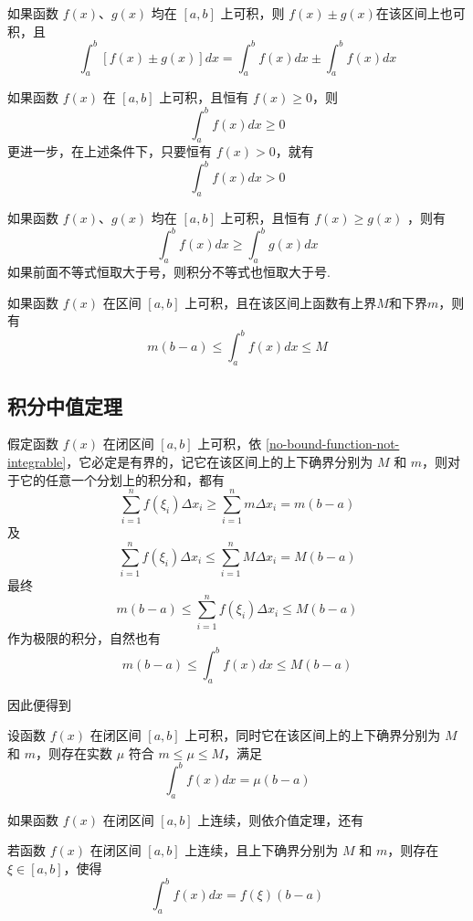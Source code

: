 \begin{property}
  如果函数 $f(x)$、$g(x)$ 均在 $[a,b]$ 上可积，则 $f(x)\pm g(x)$在该区间上也可积，且
  \[ \int_a^b [f(x) \pm g(x)] dx =  \int_a^b f(x) dx \pm \int_a^b f(x) dx \]
\end{property}

\begin{property}
  如果函数 $f(x)$ 在 $[a,b]$ 上可积，且恒有 $f(x) \geqslant 0$，则
  \[ \int_a^b f(x) dx \geqslant 0 \]
  更进一步，在上述条件下，只要恒有 $f(x) > 0$，就有
  \[ \int_a^b f(x) dx > 0 \]
\end{property}

\begin{property}
  如果函数 $f(x)$、$g(x)$ 均在 $[a,b]$ 上可积，且恒有 $f(x) \geqslant g(x)$ ，则有
  \[ \int_a^b f(x) dx \geqslant \int_a^{b} g(x) dx \] 
  如果前面不等式恒取大于号，则积分不等式也恒取大于号.
\end{property}

\begin{property}
  如果函数 $f(x)$ 在区间 $[a,b]$ 上可积，且在该区间上函数有上界$M$和下界$m$，则有
  \[ m(b-a) \leqslant \int_a^{b} f(x) dx \leqslant M \]
\end{property}

\subsection{积分中值定理}
\label{sec:integral-midvalue-theoream}

假定函数 $f(x)$ 在闭区间 $[a,b]$ 上可积，依 \autoref{no-bound-function-not-integrable}，它必定是有界的，记它在该区间上的上下确界分别为 $M$ 和 $m$，则对于它的任意一个分划上的积分和，都有
\[ \sum_{i=1}^nf(\xi_i)\Delta x_i \geqslant \sum_{i=1}^n m\Delta x_i = m(b-a) \]
及
\[ \sum_{i=1}^nf(\xi_i)\Delta x_i \leqslant \sum_{i=1}^n M\Delta x_i = M(b-a) \]
最终
\[ m(b-a) \leqslant \sum_{i=1}^nf(\xi_i)\Delta x_i \leqslant  M(b-a) \]
作为极限的积分，自然也有
\[ m(b-a) \leqslant \int_a^{b} f(x) dx \leqslant M(b-a) \]

因此便得到
\begin{theorem}
  \label{theorem:integra-midvalue}
  设函数 $f(x)$ 在闭区间 $[a,b]$ 上可积，同时它在该区间上的上下确界分别为 $M$ 和 $m$，则存在实数 $\mu$ 符合 $m \leqslant \mu \leqslant M$，满足
\[ \int_a^{b} f(x) dx = \mu(b-a) \]
\end{theorem}

如果函数 $f(x)$ 在闭区间 $[a,b]$ 上连续，则依介值定理，还有
\begin{theorem}
  \label{theorem:integral-midvalue-theoream-of-continuous-function}
  若函数 $f(x)$ 在闭区间 $[a,b]$ 上连续，且上下确界分别为 $M$ 和 $m$，则存在 $\xi \in [a,b]$，使得
\[ \int_a^{b} f(x) dx = f(\xi)(b-a) \]
\end{theorem}




